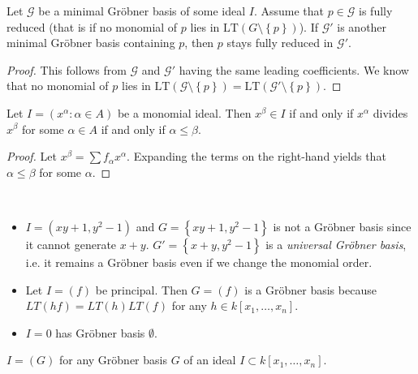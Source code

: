 \documentclass[a4paper, 11pt]{article}
\begin{document}
\begin{lemma}
  Let \( \mathcal{G} \) be a minimal Gröbner basis of some ideal \( I \). Assume that \( p \in \mathcal{G} \) is fully reduced (that is if no monomial of \( p \) lies in \( \mathrm{LT}(G \setminus \left\{ p \right\}) \)). If \( \mathcal{G}' \) is another minimal Gröbner basis containing \( p \), then \( p \) stays fully reduced in \( \mathcal{G}' \).
\end{lemma}

\begin{proof}
  This follows from \( \mathcal{G} \) and \( \mathcal{G}' \) having the same leading coefficients. We know that no monomial of \( p \) lies in \( \mathrm{LT}(\mathcal{G} \setminus \left\{ p \right\}) = \mathrm{LT}(\mathcal{G}' \setminus \left\{ p \right\})  \).
\end{proof}

\begin{lemma}
  Let \( I = (x^\alpha : \alpha \in A ) \) be a monomial ideal. Then \( x^\beta \in I \) if and only if \( x^\alpha \) divides \( x^\beta \) for some \( \alpha \in A \) if and only if \( \alpha \leq \beta \).
\end{lemma}

\begin{proof}
  Let \( x^\beta = \sum f_\alpha x^\alpha \). Expanding the terms on the right-hand yields that \( \alpha \leq \beta \) for some \( \alpha \).
\end{proof}

\begin{eg}\(  \)
  \begin{itemize}
    \item \( I = (xy + 1, y^2 - 1) \) and \( G = \left\{ xy + 1, y^2 - 1 \right\} \) is not a Gröbner basis since it cannot generate \( x + y  \). \( G' = \left\{ x + y, y^2 - 1 \right\} \) is a \emph{universal Gröbner basis}, i.e. it remains a Gröbner basis even if we change the monomial order.
    \item Let \( I = (f)  \) be principal. Then \( G = (f) \) is a Gröbner basis because \( LT(h f) = LT(h) LT(f) \) for any \( h \in k[x_1,\dots,x_n] \).
    \item \( I = 0 \) has Gröbner basis \( \emptyset \).
  \end{itemize}
\end{eg}

\begin{mdframed}
  \begin{prop}
  \( I = (G) \) for any Gröbner basis \( G \) of an ideal \( I \subset k[x_1,\dots,x_n] \).
\end{prop}
\end{mdframed}
\end{document}
